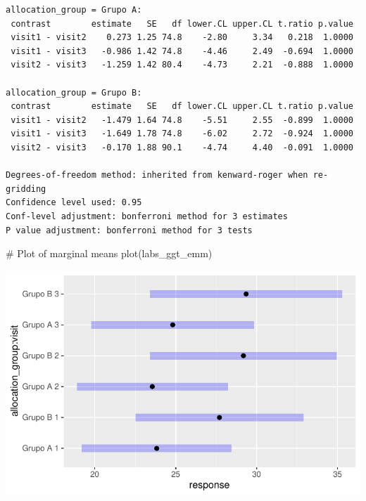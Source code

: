 \documentclass[
  letterpaper,
  DIV=11,
  numbers=noendperiod]{scrartcl}
\newenvironment{Shaded}{\begin{snugshade}}{\end{snugshade}}
\newcommand{\CommentTok}[1]{\textcolor[rgb]{0.37,0.37,0.37}{#1}}
\newcommand{\FunctionTok}[1]{\textcolor[rgb]{0.28,0.35,0.67}{#1}}
\newcommand{\NormalTok}[1]{\textcolor[rgb]{0.00,0.23,0.31}{#1}}
\begin{document}
\begin{verbatim}
allocation_group = Grupo A:
 contrast        estimate   SE   df lower.CL upper.CL t.ratio p.value
 visit1 - visit2    0.273 1.25 74.8    -2.80     3.34   0.218  1.0000
 visit1 - visit3   -0.986 1.42 74.8    -4.46     2.49  -0.694  1.0000
 visit2 - visit3   -1.259 1.42 80.4    -4.73     2.21  -0.888  1.0000

allocation_group = Grupo B:
 contrast        estimate   SE   df lower.CL upper.CL t.ratio p.value
 visit1 - visit2   -1.479 1.64 74.8    -5.51     2.55  -0.899  1.0000
 visit1 - visit3   -1.649 1.78 74.8    -6.02     2.72  -0.924  1.0000
 visit2 - visit3   -0.170 1.88 90.1    -4.74     4.40  -0.091  1.0000

Degrees-of-freedom method: inherited from kenward-roger when re-gridding 
Confidence level used: 0.95 
Conf-level adjustment: bonferroni method for 3 estimates 
P value adjustment: bonferroni method for 3 tests 
\end{verbatim}

\begin{Shaded}
\begin{Highlighting}[]
\CommentTok{\# Plot of marginal means}
\FunctionTok{plot}\NormalTok{(labs\_ggt\_emm)}
\end{Highlighting}
\end{Shaded}

\includegraphics{Outcomes_V1V2V3_files/figure-pdf/labs_ggt_sens_emm-1.pdf}
\end{document}
